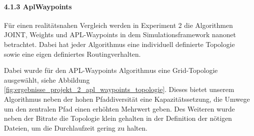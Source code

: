 \documentclass[sigconf,nonacm,review,language=english,language=german]{acmart}
\begin{document}
        \paragraph{4.1.3   AplWaypoints}
            Für einen realitätsnahen Vergleich werden in Experiment 2 die Algorithmen JOINT, Weights und APL-Waypoints in dem Simulationsframework nanonet betrachtet. Dabei hat jeder Algorithmus eine individuell definierte Topologie sowie eine eigen definiertes Routingverhalten.
            
            Dabei wurde für den APL-Waypoints Algorithmus eine Grid-Topologie ausgewählt, siehe Abbildung \ref{fig:ergebnisse_projekt_2_apl_waypoints_topologie}. Dieses bietet unserem Algorithmus neben der hohen Pfaddiversität eine Kapazitätssetzung, die Umwege um den zentralen Pfad einen erhöhten Mehrwert geben. Des Weiteren wurde neben der Bitrate die Topologie klein gehalten in der Definition der nötigen Dateien, um die Durchlaufzeit gering zu halten.
\end{document}
